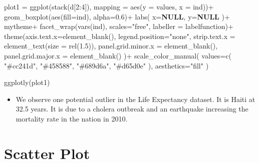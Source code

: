 \documentclass[
]{article}
\newenvironment{Shaded}{}{}
\newcommand{\AttributeTok}[1]{\textcolor[rgb]{0.84,0.60,0.13}{#1}}
\newcommand{\ConstantTok}[1]{\textcolor[rgb]{0.69,0.38,0.53}{\textbf{#1}}}
\newcommand{\DecValTok}[1]{\textcolor[rgb]{0.96,0.45,0.00}{#1}}
\newcommand{\FloatTok}[1]{\textcolor[rgb]{0.96,0.45,0.00}{#1}}
\newcommand{\FunctionTok}[1]{\textcolor[rgb]{0.41,0.62,0.42}{#1}}
\newcommand{\NormalTok}[1]{\textcolor[rgb]{0.24,0.22,0.21}{#1}}
\newcommand{\OtherTok}[1]{\textcolor[rgb]{0.41,0.62,0.42}{#1}}
\newcommand{\SpecialCharTok}[1]{\textcolor[rgb]{0.69,0.38,0.53}{#1}}
\newcommand{\StringTok}[1]{\textcolor[rgb]{0.60,0.59,0.10}{#1}}
\providecommand{\tightlist}{%
  \setlength{\itemsep}{0pt}\setlength{\parskip}{0pt}}\usepackage{longtable,booktabs,array}
\begin{document}
\begin{Shaded}
\begin{Highlighting}[]
\NormalTok{plot1 }\OtherTok{=} \FunctionTok{ggplot}\NormalTok{(}\FunctionTok{stack}\NormalTok{(d[}\DecValTok{2}\SpecialCharTok{:}\DecValTok{4}\NormalTok{]), }\AttributeTok{mapping =} \FunctionTok{aes}\NormalTok{(}\AttributeTok{y =}\NormalTok{ values, }\AttributeTok{x =}\NormalTok{ ind))}\SpecialCharTok{+}
\FunctionTok{geom\_boxplot}\NormalTok{(}\FunctionTok{aes}\NormalTok{(}\AttributeTok{fill=}\NormalTok{ind), }\AttributeTok{alpha=}\FloatTok{0.6}\NormalTok{)}\SpecialCharTok{+}
\FunctionTok{labs}\NormalTok{(}
  \AttributeTok{x=}\ConstantTok{NULL}\NormalTok{,}
  \AttributeTok{y=}\ConstantTok{NULL}
\NormalTok{  )}\SpecialCharTok{+}
\NormalTok{mytheme}\SpecialCharTok{+}
\FunctionTok{facet\_wrap}\NormalTok{(}\FunctionTok{vars}\NormalTok{(ind), }\AttributeTok{scales=}\StringTok{"free"}\NormalTok{, }\AttributeTok{labeller =}\NormalTok{ labelfunction)}\SpecialCharTok{+}
  \FunctionTok{theme}\NormalTok{(}\AttributeTok{axis.text.x=}\FunctionTok{element\_blank}\NormalTok{(),}
        \AttributeTok{legend.position=}\StringTok{"none"}\NormalTok{,}
        \AttributeTok{strip.text.x =} \FunctionTok{element\_text}\NormalTok{(}\AttributeTok{size =} \FunctionTok{rel}\NormalTok{(}\FloatTok{1.5}\NormalTok{)),}
        \AttributeTok{panel.grid.minor.x =} \FunctionTok{element\_blank}\NormalTok{(),}
        \AttributeTok{panel.grid.major.x =} \FunctionTok{element\_blank}\NormalTok{()}
\NormalTok{  )}\SpecialCharTok{+}
  \FunctionTok{scale\_color\_manual}\NormalTok{(}
      \AttributeTok{values=}\FunctionTok{c}\NormalTok{(}
        \StringTok{"\#cc241d"}\NormalTok{,}
        \StringTok{"\#458588"}\NormalTok{,}
        \StringTok{"\#689d6a"}\NormalTok{,}
        \StringTok{"\#d65d0e"}
\NormalTok{        ),}
      \AttributeTok{aesthetics=}\StringTok{"fill"}
\NormalTok{      )}


\FunctionTok{ggplotly}\NormalTok{(plot1)}
\end{Highlighting}
\end{Shaded}

\begin{itemize}
\tightlist
\item
  We observe one potential outlier in the Life Expectancy dataset. It is
  Haiti at 32.5 years. It is due to a cholera outbreak and an earthquake
  increasing the mortality rate in the nation in 2010.
\end{itemize}

\hypertarget{scatter-plot}{%
\section{Scatter Plot}\label{scatter-plot}}
\end{document}
